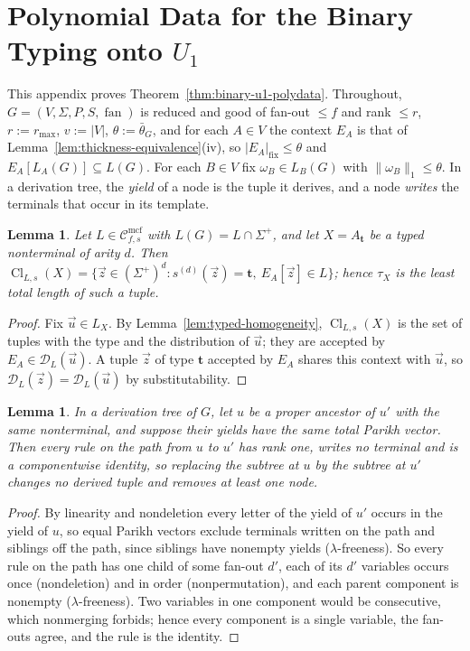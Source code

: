 \documentclass[11pt]{article}
\numberwithin{equation}{section}
\theoremstyle{plain}
\newtheorem{lemma}[theorem]{Lemma}
\theoremstyle{definition}
\theoremstyle{remark}
\newcommand{\Cmcf}[2]{\mathcal{C}^{\mathrm{mcf}}_{#1,#2}}
\newcommand{\D}{\mathcal{D}}
\newcommand{\tuple}[1]{\vec{#1}}
\newcommand{\fan}{\operatorname{fan}}
\begin{document}
\section{Polynomial Data for the Binary Typing onto \texorpdfstring{$U_1$}{U1}}
\label{app:binary-u1}

This appendix proves Theorem~\ref{thm:binary-u1-polydata}.  Throughout,
$G=(V,\Sigma,P,S,\fan)$ is reduced and good of fan-out $\le f$ and rank
$\le r$, $r:=r_{\max}$, $v:=|V|$, $\theta:=\bar\theta_G$, and for each
$A\in V$ the context $E_A$ is that of Lemma~\ref{lem:thickness-equivalence}(iv),
so $|E_A|_{\mathrm{fix}}\le\theta$ and $E_A[L_A(G)]\subseteq L(G)$.  For each $B\in V$
fix $\omega_B\in L_B(G)$ with $\|\omega_B\|_1\le\theta$.  In a derivation tree, the
\emph{yield} of a node is the tuple it derives, and a node \emph{writes} the
terminals that occur in its template.

\begin{lemma}\label{lem:app-u1-fillers}
Let $L\in\Cmcf{f}{s}$ with $L(G)=L\cap\Sigma^+$, and let $X=A_{\mathbf t}$ be a typed
nonterminal of arity $d$.  Then
$\operatorname{Cl}_{L,s}(X)=\{\tuple z\in(\Sigma^+)^d:s^{(d)}(\tuple z)=\mathbf t,\
E_A[\tuple z]\in L\}$; hence $\tau_X$ is the least total length of such a tuple.
\end{lemma}

\begin{proof}
Fix $\tuple u\in L_X$.  By Lemma~\ref{lem:typed-homogeneity},
$\operatorname{Cl}_{L,s}(X)$ is the set of tuples with the type and the
distribution of $\tuple u$; they are accepted by $E_A\in\D_L(\tuple u)$.  A tuple
$\tuple z$ of type $\mathbf t$ accepted by $E_A$ shares this context with $\tuple u$,
so $\D_L(\tuple z)=\D_L(\tuple u)$ by substitutability.
\end{proof}

\begin{lemma}\label{lem:app-u1-identity}
In a derivation tree of $G$, let $u$ be a proper ancestor of $u'$ with the same
nonterminal, and suppose their yields have the same total Parikh vector.  Then
every rule on the path from $u$ to $u'$ has rank one, writes no terminal and
is a componentwise identity, so replacing the subtree at $u$ by the subtree at
$u'$ changes no derived tuple and removes at least one node.
\end{lemma}

\begin{proof}
By linearity and nondeletion every letter of the yield of $u'$ occurs in the
yield of $u$, so equal Parikh vectors exclude terminals written on the path
and siblings off the path, since siblings have nonempty yields
($\lambda$-freeness).  So every rule on the path has one child of some fan-out
$d'$, each of its $d'$ variables occurs once (nondeletion) and in order
(nonpermutation), and each parent component is nonempty ($\lambda$-freeness).
Two variables in one component would be consecutive, which nonmerging forbids;
hence every component is a single variable, the fan-outs agree, and the rule is
the identity.
\end{proof}
\end{document}
